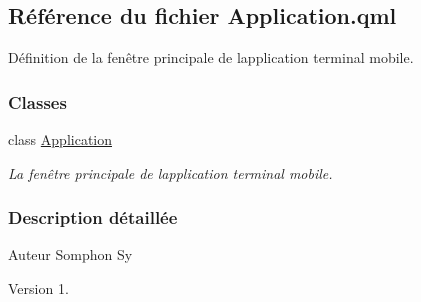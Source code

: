 \hypertarget{_application_8qml}{}\subsection{Référence du fichier Application.\+qml}
\label{_application_8qml}


Définition de la fenêtre principale de l\textquotesingle{}application terminal mobile.  


\subsubsection*{Classes}
\begin{DoxyCompactItemize}
\item 
class \hyperlink{class_application}{Application}
\begin{DoxyCompactList}\small\item\em La fenêtre principale de l\textquotesingle{}application terminal mobile. \end{DoxyCompactList}\end{DoxyCompactItemize}


\subsubsection{Description détaillée}
\begin{DoxyAuthor}{Auteur}
Somphon Sy
\end{DoxyAuthor}
\begin{DoxyVersion}{Version}
1. 
\end{DoxyVersion}
